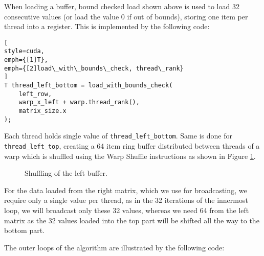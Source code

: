 When loading a buffer, bound checked load shown above is used to load 32 consecutive values (or load the value 0 if out of bounds), storing one item per thread into a register. This is implemented by the following code:
\begin{lstlisting}[
style=cuda,
emph={[1]T},
emph={[2]load\_with\_bounds\_check, thread\_rank}
]
T thread_left_bottom = load_with_bounds_check(
	left_row,
	warp_x_left + warp.thread_rank(),
	matrix_size.x
);

\end{lstlisting}

Each thread holds single value of \texttt{thread\_left\_bottom}. Same is done for \texttt{thread\_left\_top}, creating a 64 item ring buffer distributed between threads of a warp which is shuffled using the Warp Shuffle instructions as shown in Figure \ref{fig:shuffle_buffer}.

\begin{figure}[ht]
	\centering
	\def\svgwidth{\textwidth}
	
	\caption{Shuffling of the left buffer.}
	\label{fig:shuffle_buffer}
\end{figure}

For the data loaded from the right matrix, which we use for broadcasting, we require only a single value per thread, as in the 32 iterations of the innermost loop, we will broadcast only these 32 values, whereas we need 64 from the left matrix as the 32 values loaded into the top part will be shifted all the way to the bottom part.

The outer loops of the algorithm are illustrated by the following code:

